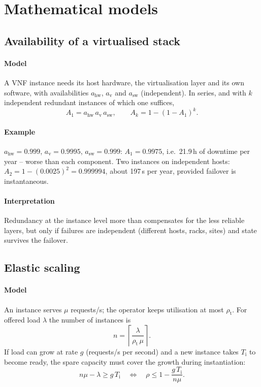 \documentclass[11pt,a4paper]{article}
\begin{document}
\section{Mathematical models}

\subsection{Availability of a virtualised stack}\label{sec:avail}
\paragraph{Model} A VNF instance needs its host hardware, the virtualisation layer and its own software, with
availabilities $a_{\mathrm{hw}}$, $a_{\mathrm{v}}$ and $a_{\mathrm{sw}}$ (independent). In series, and with $k$
independent redundant instances of which one suffices,
\begin{equation}\label{eq:series}
  A_1 = a_{\mathrm{hw}}\,a_{\mathrm{v}}\,a_{\mathrm{sw}}, \qquad
  A_{k} = 1-(1-A_1)^{k}.
\end{equation}
\paragraph{Example} $a_{\mathrm{hw}} = 0.999$, $a_{\mathrm{v}} = 0.9995$, $a_{\mathrm{sw}} = 0.999$: $A_1 = 0.9975$, i.e.\ 21.9\,h
of downtime per year -- worse than each component. Two instances on independent hosts: $A_2 = 1 - (0.0025)^2 =
0.999994$, about 197\,s per year, provided failover is instantaneous.
\paragraph{Interpretation} Redundancy at the instance level more than compensates for the less reliable layers,
but only if failures are independent (different hosts, racks, sites) and state survives the failover.

\subsection{Elastic scaling}\label{sec:scale}
\paragraph{Model} An instance serves $\mu$ requests/s; the operator keeps utilisation at most $\rho_{\mathrm{t}}$. For
offered load $\lambda$ the number of instances is
\begin{equation}\label{eq:scale}
  n = \left\lceil \frac{\lambda}{\rho_{\mathrm{t}}\,\mu} \right\rceil .
\end{equation}
If load can grow at rate $g$ (requests/s per second) and a new instance takes $T_\mathrm{i}$ to become ready, the
spare capacity must cover the growth during instantiation:
\begin{equation}\label{eq:headroom}
  n\mu - \lambda \ge g\,T_\mathrm{i}
  \quad\Longleftrightarrow\quad
  \rho \le 1 - \frac{g\,T_\mathrm{i}}{n\mu}.
\end{equation}
\end{document}
